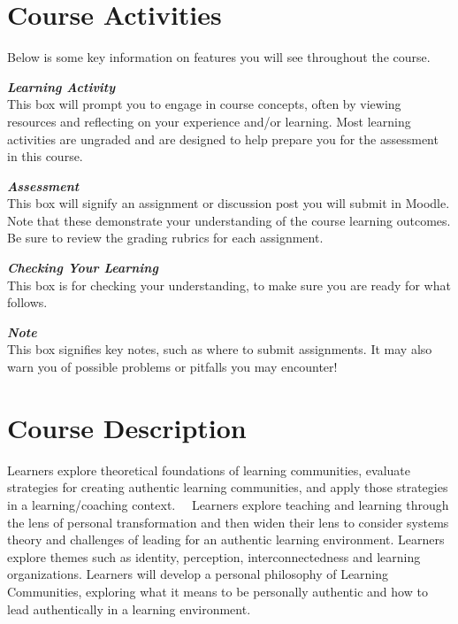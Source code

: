 \documentclass[
]{book}
\begin{document}
\hypertarget{course-activities}{%
\section*{Course Activities}\label{course-activities}}

Below is some key information on features you will see throughout the course.

\begin{reflect}
 \textbf{\emph{Learning Activity}}\\
 This box will prompt you to engage in course concepts, often by viewing
 resources and reflecting on your experience and/or learning. Most
 learning activities are ungraded and are designed to help prepare you
 for the assessment in this course.
 \end{reflect}

\begin{assessment}
 \textbf{\emph{Assessment}}\\
 This box will signify an assignment or discussion post you will submit
 in Moodle. Note that these demonstrate your understanding of the course
 learning outcomes. Be sure to review the grading rubrics for each
 assignment.
 \end{assessment}

\begin{progress}
 \textbf{\emph{Checking Your Learning}}\\
 This box is for checking your understanding, to make sure you are ready
 for what follows.
 \end{progress}

\begin{caution}
  \textbf{\emph{Note}}\\
  This box signifies key notes, such as where to submit assignments. It
  may also warn you of possible problems or pitfalls you may encounter!
  \end{caution}

\hypertarget{course-description}{%
\section*{Course Description}\label{course-description}}

Learners explore theoretical foundations of learning communities, evaluate strategies for creating authentic learning communities, and apply those strategies in a learning/coaching context.~~ Learners explore teaching and learning through the lens of personal transformation and then widen their lens to consider systems theory and challenges of leading for an authentic learning environment. Learners explore themes such as identity, perception, interconnectedness and learning organizations. Learners will develop a personal philosophy of Learning Communities, exploring what it means to be personally authentic and how to lead authentically in a learning environment.~
\end{document}
